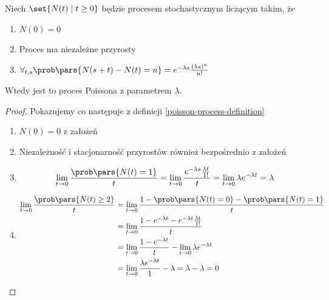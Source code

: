 \begin{theorem}[Twierdzenie 8.8 P\&C]
	Niech \(\set{N(t) \mid t \geq 0}\) będzie procesem stochastycznym liczącym takim, że
	\begin{enumerate}
		\item \(N(0) = 0\)
		\item Proces ma niezależne przyrosty
		\item \(\forall_{t,s}\prob\pars{N(s+t) - N(t) = n} = e^{-\lambda s}\frac{(\lambda s)^n}{n!}\)
	\end{enumerate}
	Wtedy jest to proces Poissona z parametrem \(\lambda\).
\end{theorem}
\begin{proof}
	Pokazujemy co następuje z definicji \ref{poisson-process-definition}
	\begin{enumerate}
		\item \( N(0) = 0 \) z założeń
		\item Niezależność i stacjonarność przyrostów również bezpośrednio z założeń
		\item
		      \[
			      \lim_{t \to 0}\frac{\prob\pars{N(t) = 1}}{t} = \lim_{t \to 0}\frac{e^{-\lambda s}\frac{\lambda t}{1!}}{t} =
			      \lim_{t \to 0}\lambda e^{-\lambda t} = \lambda
		      \]

		\item
		      \begin{align*}
			      \lim_{t \to 0}\frac{\prob\pars{N(t) \geq 2}}{t} & = \lim_{t \to 0}\frac{1 - \prob\pars{N(t) = 0} - \prob\pars{N(t) = 1}}{t}          \\
			                                                      & = \lim_{t \to 0}\frac{1-e^{-\lambda t}-e^{-\lambda t}\frac{\lambda t}{1!}}{t}      \\
			                                                      & = \lim_{t \to 0}\frac{1-e^{-\lambda t}}{t} - \lim_{t \to 0} \lambda e^{-\lambda t} \\
			                                                      & = \lim_{t \to 0}\frac{\lambda e^{-\lambda t}}{1} - \lambda = \lambda - \lambda = 0
		      \end{align*}
	\end{enumerate}
\end{proof}